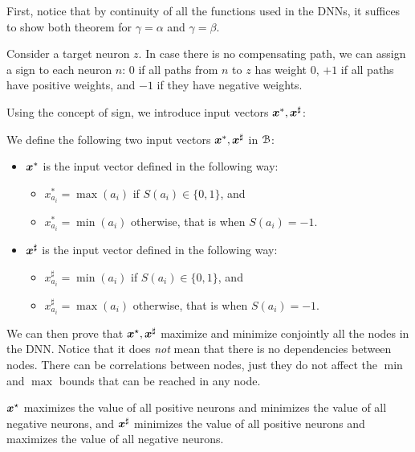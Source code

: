 First, notice that by continuity of all the functions used in the DNNs, it suffices to show both theorem for $\gamma=\alpha$ and $\gamma=\beta$.

Consider a target neuron $z$.
In case there is no compensating path, we can assign a sign to each neuron $n$: 0
if all paths from $n$ to $z$ has weight 0, $+1$ if all paths have positive weights, and 
$-1$ if they have negative weights. 

Using the concept of sign, we introduce input vectors $\boldsymbol{x}^{*}, \boldsymbol{x}^{\sharp}$: 

\begin{definition}
We define the following two input vectors $\boldsymbol{x}^{*}, \boldsymbol{x}^{\sharp}$ in $\cal B$: 
	\begin{itemize}
		\item $\boldsymbol{x}^{*}$ is the input vector defined in the following way:
		\begin {itemize}
		 \item $x^*_{a_i}=\max(a_i)$ if $S(a_i)\in \{0,1\}$, and
          \item $x^*_{a_i}=\min(a_i)$ otherwise, that is when $S(a_i)=-1$.
	\end{itemize}
		
		\item $\boldsymbol{x}^{\sharp}$ is the input vector defined in the following way:
		\begin{itemize}
			\item $x^{\sharp}_{a_i}=\min(a_i)$ if $S(a_i)\in \{0,1\}$, and
			\item $x^{\sharp}_{a_i}=\max(a_i)$ otherwise, that is when $S(a_i)=-1$.
		\end{itemize}
	\end{itemize}
\end{definition}



We can then prove that $\boldsymbol{x}^\star,\boldsymbol{x}^\sharp$ maximize and minimize conjointly all the nodes in the DNN. Notice that it does {\em not} mean that there is no dependencies between nodes.
There can be correlations between nodes, just they do not affect the $\min$ and $\max$ bounds that can be reached in any node.

\begin{proposition}
	\label{prop.sign}
	${\boldsymbol{x}^\star}$ maximizes the value of all positive neurons and minimizes the value of all negative neurons, and  
	${\boldsymbol{x}^\sharp}$ minimizes the value of all positive neurons and maximizes the value of all negative neurons.
\end{proposition}

